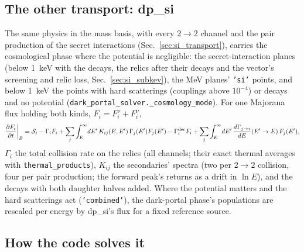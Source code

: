 \documentclass[11pt,a4paper]{article}
\begin{document}
\subsection{The other transport: dp\_si}

The same physics in the mass basis, with every $2\to2$ channel and the pair production of the secret interactions
(Sec.~\ref{sec:si_transport}), carries the cosmological phase where the potential is negligible: the secret-interaction
planes (below 1~keV with the decays, the relics after their decays and the vector's screening and relic loss,
Sec.~\ref{sec:si_subkev}), the MeV planes' \texttt{'si'} points, and below 1~keV the points with hard scatterings
(couplings above $10^{-4}$) or decays and no potential (\texttt{dark\_portal\_solver.\_cosmology\_mode}). For one Majorana flux holding
both kinds, $F_i = F_i^\nu + F_i^{\bar\nu}$,
\begin{equation}
\frac{\partial F_i}{\partial t}\bigg|_E = \mathcal{S}_i - \Gamma_iF_i
+ \sum_{j}\int_E^\infty\! dE'\,K_{ij}(E, E')\,\Gamma_j(E')F_j(E')
- \Gamma^{\rm dec}_iF_i + \sum_j\int_E^\infty\! dE'\,\frac{d\Gamma_{j\to i}}{dE}(E'\to E)\,F_j(E'),
\end{equation}
$\Gamma_i$ the total collision rate on the relics (all channels; their exact thermal averages with
\texttt{thermal\_products}), $K_{ij}$ the secondaries' spectra (two per $2\to2$ collision, four per pair production; the
forward peak's returns as a drift in $\ln E$), and the decays with both daughter halves added. Where the potential matters
and the hard scatterings act (\texttt{'combined'}), the dark-portal phase's populations are rescaled per energy by dp\_si's
flux for a fixed reference source.

\subsection{How the code solves it}
\end{document}
